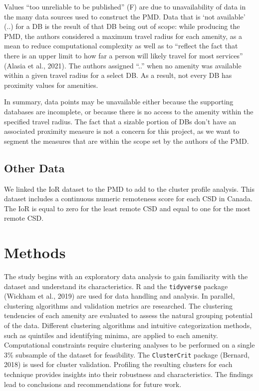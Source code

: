 \documentclass[11pt, a4paper]{article}
\begin{document}
Values ``too unreliable to be published'' (F) are due to unavailability of data in the many data sources used to construct the PMD. Data that is `not available' (..) for a DB is the result of that DB being out of scope: while producing the PMD, the authors considered a maximum travel radius for each amenity, as a mean to reduce computational complexity as well as to ``reflect the fact that there is an upper limit to how far a person will likely travel for most services'' (Alasia et al., 2021). The authors assigned ``..'' when no amenity was available within a given travel radius for a select DB. As a result, not every DB has proximity values for amenities.
\par
In summary, data points may be unavailable either because the supporting databases are incomplete, or because there is no access to the amenity within the specified travel radius. The fact that a sizable portion of DBs don't have an associated proximity measure is not a concern for this project, as we want to segment the measures that are within the scope set by the authors of the PMD.








\subsection{Other Data}


We linked the IoR dataset to the PMD to add to the cluster profile analysis. This dataset includes a continuous numeric remoteness score for each CSD in Canada. The IoR is equal  to zero for the least remote CSD and equal to one for the most remote CSD.









\pagebreak
\section{Methods}

The study begins with an exploratory data analysis to gain familiarity with the dataset and understand its characteristics. R and the \texttt{tidyverse} package (Wickham et al., 2019) are used for data handling and analysis. In parallel, clustering algorithms and validation metrics are researched. The clustering tendencies of each amenity are evaluated to assess the natural grouping potential of the data. Different clustering algorithms and intuitive categorization methods, such as quintiles and identifying minima, are applied to each amenity. Computational constraints require clustering analyses to be performed on a single 3\% subsample of the dataset for feasibility. The \texttt{ClusterCrit} package (Bernard, 2018) is used for cluster validation. Profiling the resulting clusters for each technique provides insights into their robustness and characteristics. The findings lead to conclusions and recommendations for future work.
\end{document}
